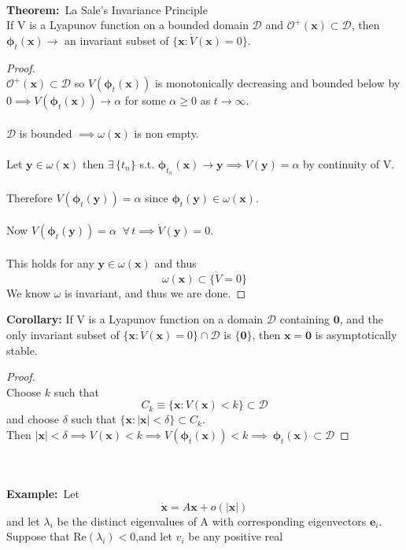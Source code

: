 \documentclass{article}
\newcommand{\cO}{\mathcal{O}}                               %
\newcommand{\domain}{\mathcal{D}}                           %
\newcommand{\example}{\textbf{Example:}}                    %
\newcommand{\theorem}{\textbf{Theorem:}}                    %
\newcommand{\bp}{\bm{\phi}}                                 %
\newcommand{\bx}{\bm{x}}                                    %
\begin{document}
\\
\theorem\ La Sale's Invariance Principle
\\
If V is a Lyapunov function on a bounded domain $\domain$ and
$\cO^+(\bx) \subset \domain$, then $\bp_t(\bx) \to$ an invariant subset of
$\{ \bx : \dot{V}(\bx) = 0 \} $.
%
\begin{proof} ~
\\
$\cO^+(\bx) \subset \domain$ so $V(\bp_t(\bx))$ is monotonically decreasing
and bounded below by $0 \implies V(\bp_t(\bx)) \to \alpha$ for some 
$\alpha \geq 0$ as $t \to \infty$.
\\
\\
$\domain$ is bounded $\implies \omega(\bx)$ is non empty.
\\
\\
Let $\bm{y} \in \omega(\bx)$ then 
$\exists \, \{t_n\}$ s.t. $\bp_{t_n}(\bx) \to \bm{y} \implies V(\bm{y}) = \alpha$ 
by continuity of V.
\\
\\
Therefore $V(\bp_t(\bm{y})) = \alpha$ since $\bp_t(\bm{y}) \in \omega(\bx)$.
\\
\\
Now $V(\bp_t(\bm{y})) = \alpha \;\; \forall \, t \implies \dot{V}(\bm{y}) = 0$.
\\
\\
This holds for any $\bm{y} \in \omega(\bx)$ and thus
\[ \omega(\bx) \subset \{ \dot{V} = 0 \} \]
We know $\omega$ is invariant, and thus we are done.
\end{proof}
\noindent \textbf{Corollary:} If V is a Lyapunov function on a domain $\domain$ 
containing $\bm{0}$, and the only invariant subset of 
$\{ \bx:\dot{V}(\bx) = 0\} \cap \domain$ is $\{ \bm{0} \}$, then $\bx = \bm{0}$
is asymptotically stable.
%
\begin{proof} ~
\\
Choose $k$ such that 
\[ C_k \equiv \{ \bx : V(\bx) <k \} \subset \domain \]
and choose $\delta$ such that $ \{ \bx :| \bx | < \delta \} \subset C_k$.
\\
Then $|\bx| < \delta \implies V(\bx) <k \implies V(\bp_t(\bx)) < k \implies \
\bp_t(\bx) \subset \domain$
\end{proof}
\noindent \\ \\
\example\ Let
\[\dot{\bx} = A \bx + o(|\bx|)\]
and let $\lambda_i$ be the distinct eigenvalues of A with corresponding 
eigenvectors $\bm{e}_i$.
\\ 
Suppose that Re$(\lambda_i) <0$,and let $v_i$ be any positive real
\end{document}
